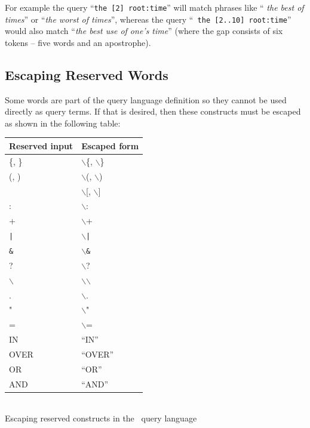 For example the query ``{\tt the [2] root:time}'' will match phrases like ``{\it
the best of times}'' or ``{\it the worst of times}'', whereas the query ``{\tt
the [2..10] root:time}'' would also match ``{\it the best use of one's time}''
(where the gap consists of six tokens -- five words and an apostrophe).

\subsection{Escaping Reserved Words}

Some words are part of the query language definition so they cannot be used
directly as query terms. If that is desired, then these constructs must be
escaped as shown in the following table:
\begin{center}
\begin{tabular}{|l|l|}
\hline
{\bf Reserved input} & {\bf Escaped form}\\
\hline \hline
\{, \} &  $\backslash$\{, $\backslash$\}\\
\hline
(, )  & $\backslash$(, $\backslash$) \\
\hline
[, ] & $\backslash$[, $\backslash$]\\
\hline
: &  $\backslash$: \\
\hline
+ &  $\backslash$+ \\
\hline
{\tt |} &  $\backslash${\tt |} \\
\hline
{\tt \&} &  $\backslash${\tt \&} \\
\hline
? &  $\backslash$? \\
\hline
$\backslash$ &  $\backslash$$\backslash$ \\
\hline
. &  $\backslash$. \\
\hline
" &  $\backslash$" \\
\hline 
=  & $\backslash$= \\
\hline
IN & ``IN'' \\
\hline
OVER & ``OVER''\\ 
\hline
OR & ``OR''\\ 
\hline
AND & ``AND''\\ 
\hline
\end{tabular}\\
\vspace{1ex}
Escaping reserved constructs in the \Mimir\ query language
\end{center}


